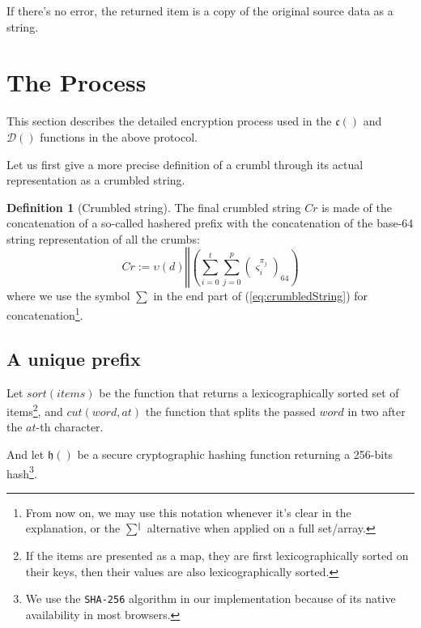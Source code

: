 \documentclass[twoside,twocolumn]{article}
\theoremstyle{definition}
\newtheorem{definition}{Definition}
\theoremstyle{remark}
\begin{document}
If there's no error, the returned item is a copy of the original source data as a string.


\section{The Process}

This section describes the detailed encryption process used in the $\mathfrak{c}()$ and $\mathcal{D}()$ functions in the above protocol.

Let us first give a more precise definition of a crumbl through its actual representation as a crumbled string.
\begin{definition}[Crumbled string]
    \label{crumbledString}
    The final crumbled string $Cr$ is made of the concatenation of a so-called hashered prefix with the concatenation of the base-64 string 
    representation of all the crumbs:
    \begin{equation}
        \label{eq:crumbledString}
        Cr := \upsilon(d) \mathbin\Vert \left( \sum_{i=0}^t \sum_{j=0}^p (\varsigma_i^{\pi_j})_{64} \right)
    \end{equation}
    where we use the symbol $\sum$ in the end part of (\ref{eq:crumbledString}) for concatenation\footnote{From now on, we may use this notation 
    whenever it's clear in the explanation, or the $\sum^{\mathbin\Vert}$ alternative when applied on a full set/array.}.
\end{definition}

\subsection{A unique prefix}

Let $sort(items)$ be the function that returns a lexicographically sorted set of items\footnote{
    If the items are presented as a map, they are first lexicographically sorted on their keys, then their values are also lexicographically sorted.
}, and $cut(word, at)$ the function that splits the passed $word$ in two after the $at$-th character.

And let $\mathfrak{h}()$ be a secure cryptographic hashing function returning a 256-bits hash\footnote{We use the \texttt{SHA-256} algorithm in our 
implementation because of its native availability in most browsers.}.
\end{document}
